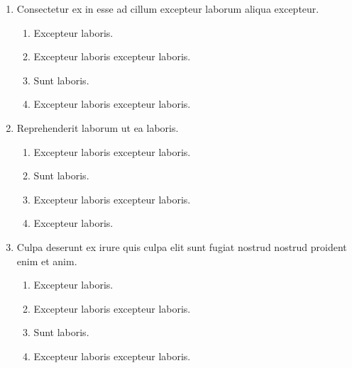 \documentclass[a4paper,12pt]{article}
\begin{document}
\begin{enumerate}[label=\textbf{\arabic*.}]
\begin{multicols}{2}
\end{multicols}
\item Consectetur ex in esse ad cillum excepteur laborum aliqua excepteur.
\begin{multicols}{2}
	\begin{enumerate}
		\item  Excepteur laboris.
    
		\item  Excepteur laboris excepteur laboris.
  
		\item  Sunt laboris.
    
		\item  Excepteur laboris excepteur laboris.
    
	\end{enumerate}

\end{multicols}
\item Reprehenderit laborum ut ea laboris.
\begin{multicols}{2}
	\begin{enumerate}
		\item  Excepteur laboris excepteur laboris.
  
		\item  Sunt laboris.
    
		\item  Excepteur laboris excepteur laboris.
    
		\item  Excepteur laboris.
    
	\end{enumerate}

\end{multicols}
\item Culpa deserunt ex irure quis culpa elit sunt fugiat nostrud nostrud proident enim et anim.
\begin{multicols}{2}
	\begin{enumerate}
		\item  Excepteur laboris.
    
		\item  Excepteur laboris excepteur laboris.
  
		\item  Sunt laboris.
    
		\item  Excepteur laboris excepteur laboris.
    
	\end{enumerate}


\end{multicols}
\end{enumerate}
\end{document}
